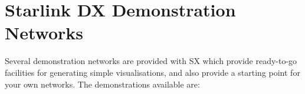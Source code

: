 



%
%
%
%
%





\newpage
\section{Starlink DX Demonstration Networks
\label{DEMONET}  }


%
Several demonstration networks are provided with SX which provide
ready-to-go facilities for generating simple visualisations, and also provide
a starting point for your own networks. The demonstrations available are:

